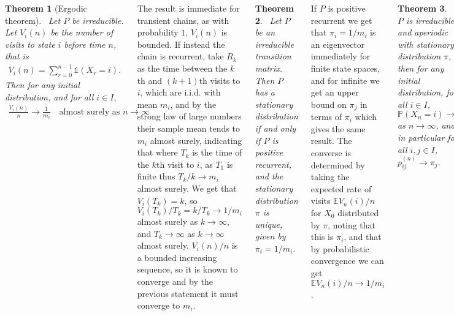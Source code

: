 \documentclass{tikzposter} %
\newtheorem{theorem}{Theorem}
\begin{document}
\begin{columns}
{  \begin{theorem}[Ergodic theorem]
  \ Let $P$ be irreducible. Let $V_{i}(n)$ be the number of visits to state $i$ before time $n$, that is
    \begin{align*}
      V_{i}(n) = \sum_{r=0}^{n-1} \mathds{1}(X_{r} = i).
    \end{align*}
    Then for any initial distribution, and for all $i \in I$,
    \begin{align*}
      \frac{V_{i}(n)}{n} \to \frac{1}{m_{i}} \quad \text{almost surely as } n \to \infty
    \end{align*}
  \end{theorem}
  \hphantom{}

  The result is immediate for transient chains, as with probability $1$, $V_{i}(n)$ is bounded. If instead the chain is recurrent, take $R_{k}$ as the time between the $k$th and $(k+1)$th visits to $i$, which are i.i.d. with mean $m_{i}$, and by the strong law of large numbers their sample mean tends to $m_{i}$ almost surely, indicating that where $T_{k}$ is the time of the $k$th visit to $i$, as $T_{1}$ is finite thus $T_{k} / k \to m_{i}$ almost surely. We get that $V_{i}(T_{k}) = k$, so $V_{i}(T_{k})/T_{k} = k / T_{k} \to 1/m_{i}$ almost surely as $k \to \infty$, and $T_{k} \to \infty$ as $k \to \infty$ almost surely. $V_{i}(n)/n$ is a bounded increasing sequence, so it is known to converge and by the previous statement it must converge to $m_{i}$. \\

  \begin{theorem}
  \ Let $P$ be an irreducible transition matrix. Then $P$ has a stationary distribution if and only if $P$ is positive recurrent, and the stationary distribution $\pi$ is unique, given by $\pi_{i} = 1/m_{i}$.
  \end{theorem}
  \hphantom{}

  If $P$ is positive recurrent we get that $\pi_{i} = 1/m_{i}$ is an eigenvector immediately for finite state spaces, and for infinite we get an upper bound on $\pi_{j}$ in terms of $\pi_{i}$ which gives the same result. The converse is determined by taking the expected rate of visits $\mathbb{E} V_{n}(i)/n$ for $X_{0}$ distributed by $\pi$, noting that this is $\pi_{i}$, and that by probabilistic convergence we can get $\mathbb{E}V_{n}(i)/n \to 1/m_{i}$. \\

  \begin{theorem}
  \ If $P$ is irreducible and aperiodic with stationary distribution $\pi$, then for any initial distribution, for all $i \in I$, $\mathbb{P}(X_{n} = i) \to \pi_{i}$ as $n \to \infty$, and in particular for all $i, j \in I$, $p_{ij}^{(n)} \to \pi_{j}$.
  \end{theorem}
  \hphantom{}

}
\end{columns}
\end{document}
